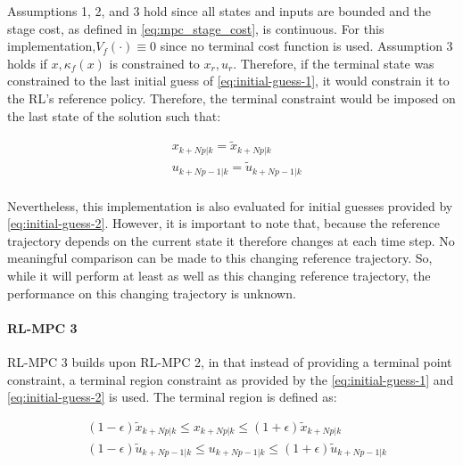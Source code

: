 Assumptions 1, 2, and 3 hold since all states and inputs are bounded and the stage cost, as defined in \autoref{eq:mpc_stage_cost}, is continuous. For this implementation,$V_f(\cdot) \equiv 0$ since no terminal cost function is used. Assumption 3 holds if $x,\kappa_f(x)$ is constrained to $x_r,u_r$. Therefore, if the terminal state was constrained to the last initial guess of \autoref{eq:initial-guess-1}, it would constrain it to the RL’s reference policy. Therefore, the terminal constraint would be imposed on the last state of the solution such that:

\begin{equation}\label{eq:terminal-constraint-ocp}
\begin{aligned}
	&x_{k+Np|k} = \tilde{x}_{k+Np|k}\\ 
	&u_{k+Np-1|k} = \tilde{u}_{k+Np-1|k}\\
\end{aligned}
\end{equation}

Nevertheless, this implementation is also evaluated for initial guesses provided by \autoref{eq:initial-guess-2}. However, it is important to note that, because the reference trajectory depends on the current state it therefore changes at each time step. No meaningful comparison can be made to this changing reference trajectory. So, while it will perform at least as well as this changing reference trajectory, the performance on this changing trajectory is unknown.

\paragraph{RL-MPC 3}
RL-MPC 3 builds upon RL-MPC 2, in that instead of providing a terminal point constraint, a terminal region constraint as provided by the \autoref{eq:initial-guess-1} and \autoref{eq:initial-guess-2} is used. The terminal region is defined as:

\begin{equation}\label{eq:terminal-region}
	\begin{aligned}
		& (1-\epsilon)\tilde{x}_{k+Np|k} \leq x_{k+Np|k} \leq (1+\epsilon)\tilde{x}_{k+Np|k}\\
		&(1-\epsilon)\tilde{u}_{k+Np-1|k} \leq u_{k+Np-1|k} \leq (1+\epsilon) \tilde{u}_{k+Np-1|k}\\
	\end{aligned}
\end{equation}

